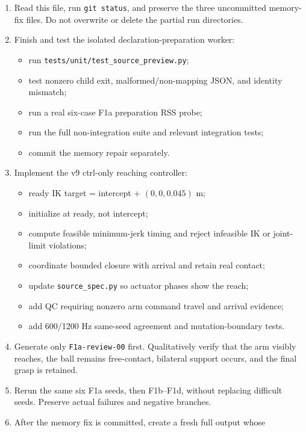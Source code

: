 \documentclass[11pt]{article}
\begin{document}
\begin{enumerate}
  \item Read this file, run \texttt{git status}, and preserve the three
        uncommitted memory-fix files.  Do not overwrite or delete the partial
        run directories.
  \item Finish and test the isolated declaration-preparation worker:
    \begin{itemize}
      \item run \texttt{tests/unit/test\_source\_preview.py};
      \item test nonzero child exit, malformed/non-mapping JSON, and identity
            mismatch;
      \item run a real six-case F1a preparation RSS probe;
      \item run the full non-integration suite and relevant integration tests;
      \item commit the memory repair separately.
    \end{itemize}
  \item Implement the v9 ctrl-only reaching controller:
    \begin{itemize}
      \item ready IK target = intercept + \((0,0,0.045)\) m;
      \item initialize at ready, not intercept;
      \item compute feasible minimum-jerk timing and reject infeasible IK or
            joint-limit violations;
      \item coordinate bounded closure with arrival and retain real contact;
      \item update \texttt{source\_spec.py} so actuator phases show the reach;
      \item add QC requiring nonzero arm command travel and arrival evidence;
      \item add 600/1200 Hz same-seed agreement and mutation-boundary tests.
    \end{itemize}
  \item Generate only \texttt{F1a-review-00} first.  Qualitatively verify that
        the arm visibly reaches, the ball remains free-contact, bilateral
        support occurs, and the final grasp is retained.
  \item Rerun the same six F1a seeds, then F1b--F1d, without replacing difficult
        seeds.  Preserve actual failures and negative branches.
  \item After the memory fix is committed, create a fresh full output whose

\end{enumerate}
\end{document}
